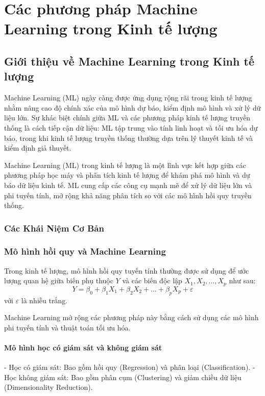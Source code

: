 \chapter{Các phương pháp Machine Learning trong Kinh tế lượng}
\section{Giới thiệu về Machine Learning trong Kinh tế lượng}
Machine Learning (ML) ngày càng được ứng dụng rộng rãi trong kinh tế lượng nhằm nâng cao độ chính xác của mô hình dự báo, kiểm định mô hình và xử lý dữ liệu lớn. Sự khác biệt chính giữa ML và các phương pháp kinh tế lượng truyền thống là cách tiếp cận dữ liệu: ML tập trung vào tính linh hoạt và tối ưu hóa dự báo, trong khi kinh tế lượng truyền thống thường dựa trên lý thuyết kinh tế và kiểm định giả thuyết.

Machine Learning (ML) trong kinh tế lượng là một lĩnh vực kết hợp giữa các phương pháp học máy và phân tích kinh tế lượng để khám phá mô hình và dự báo dữ liệu kinh tế. ML cung cấp các công cụ mạnh mẽ để xử lý dữ liệu lớn và phi tuyến tính, mở rộng khả năng phân tích so với các mô hình hồi quy truyền thống.

\subsection{Các Khái Niệm Cơ Bản}
\subsection{Mô hình hồi quy và Machine Learning}
Trong kinh tế lượng, mô hình hồi quy tuyến tính thường được sử dụng để ước lượng quan hệ giữa biến phụ thuộc $Y$ và các biến độc lập $X_1, X_2, \dots, X_p$ như sau:
\begin{equation}
    Y = \beta_0 + \beta_1 X_1 + \beta_2 X_2 + \dots + \beta_p X_p + \varepsilon
\end{equation}
với $\varepsilon$ là nhiễu trắng.

Machine Learning mở rộng các phương pháp này bằng cách sử dụng các mô hình phi tuyến tính và thuật toán tối ưu hóa.

\subsubsection{Mô hình học có giám sát và không giám sát}
- Học có giám sát: Bao gồm hồi quy (Regression) và phân loại (Classification).
- Học không giám sát: Bao gồm phân cụm (Clustering) và giảm chiều dữ liệu (Dimensionality Reduction).

